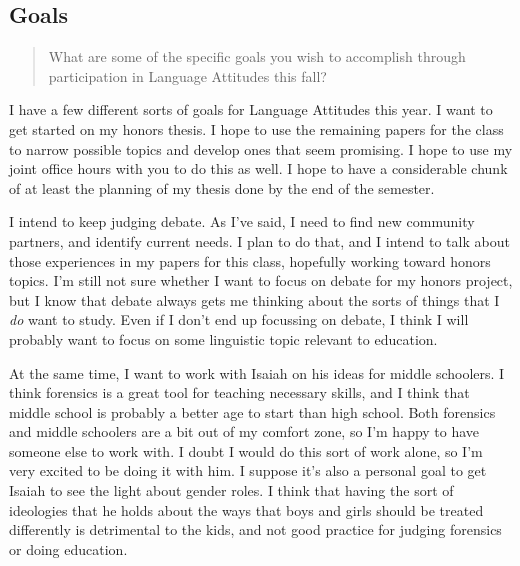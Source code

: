\documentclass[doc,12pt]{apa6}
\begin{document}
\subsection{Goals}\label{goals}

\begin{quote}
		What are some of the specific goals you wish to accomplish through
		participation in Language Attitudes this fall?
\end{quote}

I have a few different sorts of goals for Language Attitudes this year.
I want to get started on my honors thesis. I hope to use the remaining
papers for the class to narrow possible topics and develop ones that
seem promising. I hope to use my joint office hours with you to do this
as well. I hope to have a considerable chunk of at least the planning of
my thesis done by the end of the semester.

I intend to keep judging debate. As I've said, I need to find new
community partners, and identify current needs. I plan to do that, and I
intend to talk about those experiences in my papers for this class,
hopefully working toward honors topics. I'm still not sure whether I
want to focus on debate for my honors project, but I know that debate
always gets me thinking about the sorts of things that I \emph{do} want
to study. Even if I don't end up focussing on debate, I think I will
probably want to focus on some linguistic topic relevant to education.

At the same time, I want to work with Isaiah on his ideas for middle
schoolers. I think forensics is a great tool for teaching necessary
skills, and I think that middle school is probably a better age to start
than high school. Both forensics and middle schoolers are a bit out of
my comfort zone, so I'm happy to have someone else to work with. I doubt
I would do this sort of work alone, so I'm very excited to be doing it
with him. I suppose it's also a personal goal to get Isaiah
to see the light about gender roles. I think that having the sort of
ideologies that he holds about the ways that boys and girls should be
treated differently is detrimental to the kids, and not good practice
for judging forensics or doing education.
\end{document}
